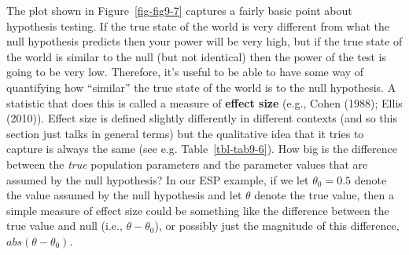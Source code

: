 \documentclass[
  a4paper,
]{book}
\begin{document}
The plot shown in Figure~\ref{fig-fig9-7} captures a fairly basic point
about hypothesis testing. If the true state of the world is very
different from what the null hypothesis predicts then your power will be
very high, but if the true state of the world is similar to the null
(but not identical) then the power of the test is going to be very low.
Therefore, it's useful to be able to have some way of quantifying how
``similar'' the true state of the world is to the null hypothesis. A
statistic that does this is called a measure of \textbf{effect size}
(e.g., Cohen (1988); Ellis (2010)). Effect size is defined slightly
differently in different contexts (and so this section just talks in
general terms) but the qualitative idea that it tries to capture is
always the same (see e.g. Table~\ref{tbl-tab9-6}). How big is the
difference between the \emph{true} population parameters and the
parameter values that are assumed by the null hypothesis? In our ESP
example, if we let \(\theta_0 = 0.5\) denote the value assumed by the
null hypothesis and let \(\theta\) denote the true value, then a simple
measure of effect size could be something like the difference between
the true value and null (i.e., \(\theta - \theta_0\)), or possibly just
the magnitude of this difference, \(abs(\theta - \theta_0)\).

\hypertarget{tbl-tab9-6}{}
 
  \providecommand{\huxb}[2]{\arrayrulecolor[RGB]{#1}\global\arrayrulewidth=#2pt}
  \providecommand{\huxvb}[2]{\color[RGB]{#1}\vrule width #2pt}
  \providecommand{\huxtpad}[1]{\rule{0pt}{#1}}
  \providecommand{\huxbpad}[1]{\rule[-#1]{0pt}{#1}}
\end{document}
